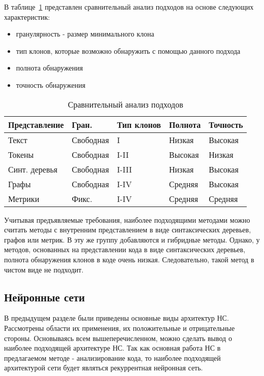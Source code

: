 В таблице~\ref{compare} представлен сравнительный анализ подходов на основе следующих характеристик:
\begin{itemize}
\setlength\itemsep{0mm}
\item гранулярность - размер минимального клона
\item тип клонов, которые возможно обнаружить с помощью данного подхода
\item полнота обнаружения
\item точность обнаружения
\end{itemize}

\begin{table}[H]
\centering
\captionsetup{skip=5pt}
\caption{Сравнительный анализ подходов}
\label{compare}
\begin{tabular}{|l|l|l|l|l|}
\hline
Представление    & Гран.		& Тип клонов & Полнота	& Точность \\ \hline
Текст            & Свободная    & I          & Низкая  	& Высокая  \\ \hline
Токены           & Свободная    & I-II       & Высокая 	& Низкая   \\ \hline
Синт. деревья	 & Свободная    & I-III      & Низкая  	& Высокая  \\ \hline
Графы            & Свободная    & I-IV       & Средняя 	& Высокая  \\ \hline
Метрики          & Фикс.		& I-IV       & Средняя 	& Средняя  \\ \hline
\end{tabular}
\end{table}

Учитывая предъявляемые требования, наиболее подходящими методами можно считать методы с внутренним представлением в виде синтаксических деревьев, графов или метрик. В эту же группу добавляются и гибридные методы. Однако, у методов, основанных на представлении кода в виде синтаксических деревьев, полнота обнаружения клонов в коде очень низкая. Следовательно, такой метод в чистом виде не подходит.

\subsection{Нейронные сети}

В предыдущем разделе были приведены основные виды архитектур НС. Рассмотрены области их применения, их положительные и отрицательные стороны. Основываясь всем вышеперечисленном, можно сделать вывод о наиболее подходящей архитектуре НС. Так как основная работа НС в предлагаемом методе - анализирование кода, то наиболее подходящей архитектурой сети будет являться рекуррентная нейронная сеть.
